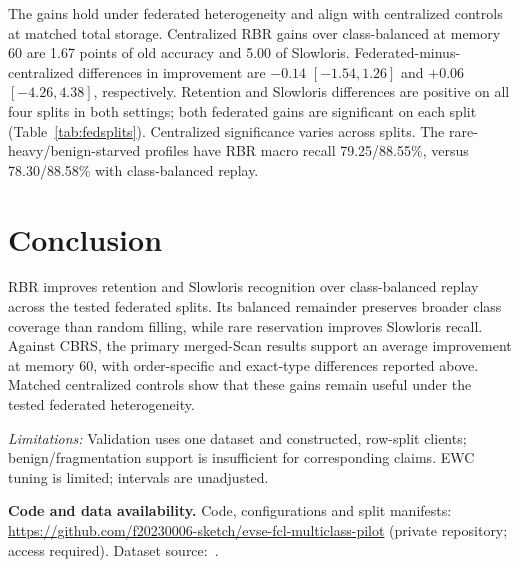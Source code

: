 \documentclass[journal,10pt]{IEEEtran}
\begin{document}
The gains hold under federated heterogeneity and align with centralized controls at matched total storage. Centralized RBR gains over class-balanced at memory 60 are 1.67 points of old accuracy and 5.00 of Slowloris. Federated-minus-centralized differences in improvement are $-0.14$ $[-1.54,1.26]$ and $+0.06$ $[-4.26,4.38]$, respectively. Retention and Slowloris differences are positive on all four splits in both settings; both federated gains are significant on each split (Table~\ref{tab:fedsplits}). Centralized significance varies across splits. The rare-heavy/benign-starved profiles have RBR macro recall 79.25/88.55\%, versus 78.30/88.58\% with class-balanced replay.



\section{Conclusion}
RBR improves retention and Slowloris recognition over class-balanced replay across the tested federated splits. Its balanced remainder preserves broader class coverage than random filling, while rare reservation improves Slowloris recall. Against CBRS, the primary merged-Scan results support an average improvement at memory 60, with order-specific and exact-type differences reported above. Matched centralized controls show that these gains remain useful under the tested federated heterogeneity.

\textit{Limitations:} Validation uses one dataset and constructed, row-split clients; benign/fragmentation support is insufficient for corresponding claims. EWC tuning is limited; intervals are unadjusted.

\noindent\textbf{Code and data availability.} Code, configurations and split manifests: \url{https://github.com/f20230006-sketch/evse-fcl-multiclass-pilot} (private repository; access required). Dataset source:~\cite{dataset}.
\end{document}

